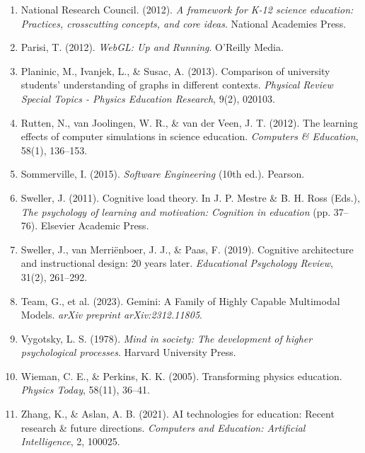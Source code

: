 \begin{enumerate}
\item National Research Council. (2012). \textit{A framework for K-12 science education: Practices, crosscutting concepts, and core ideas}. National Academies Press.

\item Parisi, T. (2012). \textit{WebGL: Up and Running}. O'Reilly Media.

\item Planinic, M., Ivanjek, L., \& Susac, A. (2013). Comparison of university students' understanding of graphs in different contexts. \textit{Physical Review Special Topics - Physics Education Research}, 9(2), 020103.

\item Rutten, N., van Joolingen, W. R., \& van der Veen, J. T. (2012). The learning effects of computer simulations in science education. \textit{Computers \& Education}, 58(1), 136–153.

\item Sommerville, I. (2015). \textit{Software Engineering} (10th ed.). Pearson.

\item Sweller, J. (2011). Cognitive load theory. In J. P. Mestre \& B. H. Ross (Eds.), \textit{The psychology of learning and motivation: Cognition in education} (pp. 37–76). Elsevier Academic Press.

\item Sweller, J., van Merriënboer, J. J., \& Paas, F. (2019). Cognitive architecture and instructional design: 20 years later. \textit{Educational Psychology Review}, 31(2), 261–292.

\item Team, G., et al. (2023). Gemini: A Family of Highly Capable Multimodal Models. \textit{arXiv preprint arXiv:2312.11805}.

\item Vygotsky, L. S. (1978). \textit{Mind in society: The development of higher psychological processes}. Harvard University Press.

\item Wieman, C. E., \& Perkins, K. K. (2005). Transforming physics education. \textit{Physics Today}, 58(11), 36–41.

\item Zhang, K., \& Aslan, A. B. (2021). AI technologies for education: Recent research \& future directions. \textit{Computers and Education: Artificial Intelligence}, 2, 100025.

\end{enumerate}

